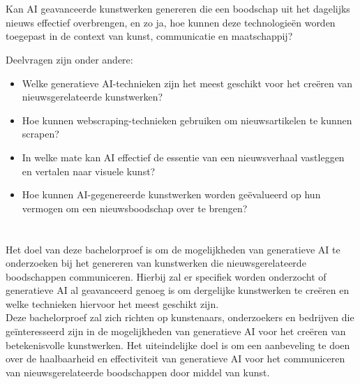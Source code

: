 \section{}%
\label{sec:onderzoeksvraag}

\noindent
Kan AI geavanceerde kunstwerken genereren die een boodschap uit het dagelijks nieuws effectief overbrengen, en zo ja, hoe kunnen deze technologieën worden toegepast in de context van kunst, communicatie en maatschappij?

Deelvragen zijn onder andere:

\begin{itemize}
    \item Welke generatieve AI-technieken zijn het meest geschikt voor het creëren van nieuwsgerelateerde kunstwerken?
    \item Hoe kunnen webscraping-technieken gebruiken om nieuwsartikelen te kunnen scrapen?
    \item In welke mate kan AI effectief de essentie van een nieuwsverhaal vastleggen en vertalen naar visuele kunst?
    \item Hoe kunnen AI-gegenereerde kunstwerken worden geëvalueerd op hun vermogen om een nieuwsboodschap over te brengen?
\end{itemize}

\pagebreak

\section{}%
\label{sec:onderzoeksdoelstelling}

\noindent
Het doel van deze bachelorproef is om de mogelijkheden van generatieve AI te onderzoeken bij het genereren van kunstwerken die nieuwsgerelateerde boodschappen communiceren. Hierbij zal er specifiek worden onderzocht of generatieve AI al geavanceerd genoeg is om dergelijke kunstwerken te creëren en welke technieken hiervoor het meest geschikt zijn.  \\

Deze bachelorproef zal zich richten op kunstenaars, onderzoekers en bedrijven die geïnteresseerd zijn in de mogelijkheden van generatieve AI voor het creëren van betekenisvolle kunstwerken. Het uiteindelijke doel is om een aanbeveling te doen over de haalbaarheid en effectiviteit van generatieve AI voor het communiceren van nieuwsgerelateerde boodschappen door middel van kunst.


